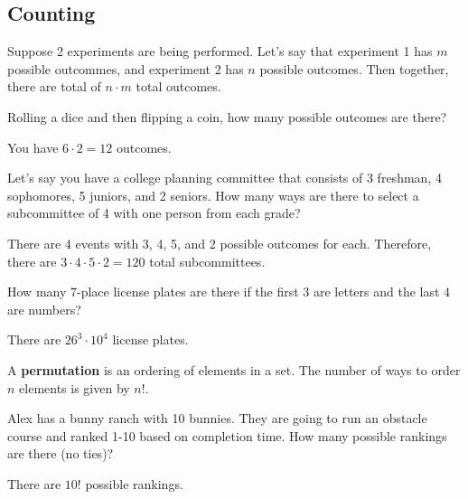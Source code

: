 \subsection{Counting}

Suppose 2 experiments are being performed. Let's say that experiment 1 has \( m \) possible outcommes, and experiment 2 has \( n \) possible outcomes. Then together, there are total of \( n\cdot m \) total outcomes.

\begin{eg}
	Rolling a dice and then flipping a coin, how many possible outcomes are there?
\end{eg}
\begin{explanation}
	You have \( 6 \cdot 2 = 12  \) outcomes.
\end{explanation}

\begin{eg}
	Let's say you have a college planning committee that consists of 3 freshman, 4 sophomores, 5 juniors, and 2 seniors. How many ways are there to select a subcommittee of 4 with one person from each grade?
\end{eg}
\begin{explanation}
	There are 4 events with 3, 4, 5, and 2 possible outcomes for each. Therefore, there are \( 3\cdot 4\cdot 5\cdot 2=120 \) total subcommittees.
\end{explanation}

\begin{eg}
	How many 7-place license plates are there if the first 3 are letters and the last 4 are numbers?
\end{eg}
\begin{explanation}
	There are \( 26^3 \cdot 10^4 \) license plates.
\end{explanation}

\begin{definition}
	A \textbf{permutation} is an ordering of elements in a set. The number of ways to order \( n \) elements is given by \( n! \).
\end{definition}

\begin{eg}
	Alex has a bunny ranch with 10 bunnies. They are going to run an obstacle course and ranked 1-10 based on completion time. How many possible rankings are there (no ties)?
\end{eg}
\begin{explanation}
	There are \( 10! \) possible rankings.
\end{explanation}

